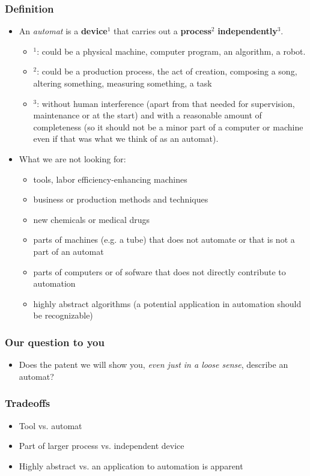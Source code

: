 \documentclass[10pt]{beamer}
\begin{document}
\begin{frame}\frametitle{Definition}
	\begin{itemize}	
	\item An \textit{automat} is a \textbf{device}$^1$ that carries out a \textbf{process}$^2$ \textbf{independently}$^3$.
		\begin{itemize}	
		\item $^1$: could be a physical machine, computer program, an algorithm, a robot.
		\item $^2$: could be a production process, the act of creation, composing a song, altering something, measuring something, a task
		\item $^3$: without human interference (apart from that needed for supervision, maintenance or at the start) and with a reasonable amount of completeness (so it should not be a minor part of a computer or machine even if that was what we think of as an automat).
		\end{itemize}
		\item What we are not looking for: 
			\begin{itemize}
			\item tools, labor efficiency-enhancing machines
			\item business or production methods and techniques
			\item new chemicals or medical drugs
			\item parts of machines (e.g. a tube) that does not automate or that is not a part of an automat
			\item parts of computers or of sofware that does not directly contribute to automation
			\item highly abstract algorithms (a potential application in automation should be recognizable)
			\end{itemize}			
	\end{itemize}
\end{frame}


\begin{frame}\frametitle{Our question to you}
\vspace{0.6cm}
	\begin{itemize}	
	\item Does the patent we will show you, \textit{even just in a loose sense}, describe an automat?
	\end{itemize}
\end{frame}



\begin{frame}\frametitle{Tradeoffs}
\vspace{0.6cm}
	\begin{itemize}	
	\item Tool vs. automat
	\item Part of larger process vs. independent device
	\item Highly abstract vs. an application to automation is apparent
	\end{itemize}
\end{frame}
\end{document}

